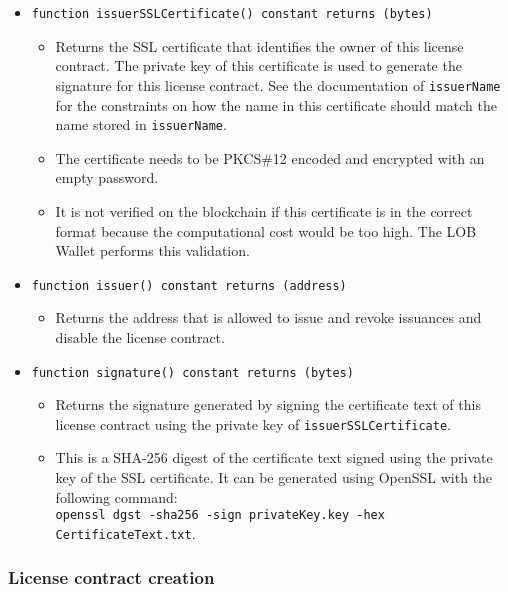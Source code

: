 \documentclass[a4paper]{article}
\begin{document}
\begin{itemize}
  \item \texttt{function issuerSSLCertificate() constant returns (bytes)}
  \begin{itemize}
    \item Returns the SSL certificate that identifies the owner of this license contract. The private key of this certificate is used to generate the signature for this license contract. See the documentation of \texttt{issuerName} for the  constraints on how the name in this certificate should match the name  stored in \texttt{issuerName}.
    \item The certificate needs to be PKCS\#12 encoded and encrypted with an empty password.
    \item It is not verified on the blockchain if this certificate is in the correct format because the computational cost would be too high. The LOB Wallet performs this validation.
  \end{itemize}
  
  \item \texttt{function issuer() constant returns (address)}
  \begin{itemize}
    \item Returns the address that is allowed to issue and revoke issuances and disable the license contract.
  \end{itemize}
  
  \item \texttt{function signature() constant returns (bytes)}
  \begin{itemize}
    \item Returns the signature generated by signing the certificate text of this license contract using the private key of \texttt{issuerSSLCertificate}.
    \item This is a SHA-256 digest of the certificate text signed using the private key of the SSL certificate. It can be generated using OpenSSL with the following command: \\\texttt{openssl dgst -sha256 -sign privateKey.key -hex CertificateText.txt}.
  \end{itemize}
\end{itemize}

\subsubsection{License contract creation}
\end{document}
